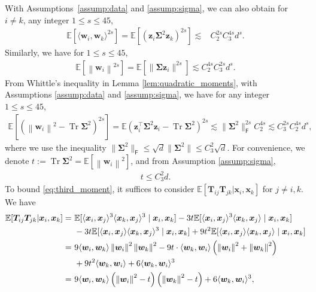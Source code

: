 \documentclass[twoside,11pt]{article}
\newcommand{\norm}[1]{\left\|#1\right\|}
\newcommand{\bw}{\boldsymbol{w}}
\newcommand{\E}{\mathbb{E}}
\def\bw{{\boldsymbol w}}
\def\bx{{\boldsymbol x}}
\def\bz{{\boldsymbol z}}
\def\bSigma{{\boldsymbol \Sigma}}
\def\T{{\mathbb T}}
\def\T{{\mathbb T}}
\renewcommand{\T}{\boldsymbol{T}}
\newcommand{\Tr}{\operatorname{Tr}}
\newcommand{\1}{\mathbf{1}}
\def\msf{\mathsf}
\begin{document}
\begin{enumerate}[label=\textbf{Case (\roman*).},leftmargin=0ex, itemindent=12ex]
 
With Assumptions~\ref{assump:data} and \ref{assump:sigma},  we can also obtain for $i\not=k$, any integer $1\leq s\leq 45$, 
\begin{align}
    \E\left[\langle \bw_i,\bw_k\rangle^{2s}\right]=\E[(\bz_i\bSigma^2 \bz_k)^{2s}] \lesssim &  C_2^{2s}C_3^{4s}d^s. \label{eq:wiwk}
\end{align}
Similarly, we have for $1\leq s\leq 45$,
\begin{align}\label{eq:wi}
  \E\left[\norm{\bw_i}^{2s}\right] =\E [\| \bSigma \bz_i\|^{2s}]\lesssim  C_2^{4s} C_3^{2s}d^{s}.
\end{align}
From Whittle's inequality \citep{whittle1960bounds} in  Lemma \ref{lem:quadratic_moments}, with Assumptions \ref{assump:data} and  \ref{assump:sigma}, we have for any integer $1\leq s\leq  45$,
\begin{align}
     \E\left[\left(\norm{\bw_i}^2-\Tr\bSigma^2\right)^{2s} \right]=\E (\bz_i^\top\bSigma^2 \bz_i-\Tr\bSigma^2)^{2s}\lesssim  \|\bSigma^2\|_{\msf F}^{2s} C_2^{4s}  \lesssim C_3^{2s} C_2^{4s}d^s,\label{eq:centered6}
\end{align}
where we use the inequality $\|\bSigma^2\|_{\msf F}\leq \sqrt{d} \|\bSigma^2\|\leq C_3^2 \sqrt{d}$. For convenience, we denote $t:=\Tr\bSigma^2=\E[\norm{\bw_i}^2]$, and from Assumption \ref{assump:sigma},
\begin{align}\label{eq:bound_t}
  t\leq C_3^2d.  
\end{align}
To bound \eqref{eq:third_moment}, it suffices to consider $\E [\T_{ij}\T_{jk}| \bx_i,\bx_k]$ for $j\not=i,k$. We have
\begin{align}
    \E [\T_{ij}\T_{jk}| \bx_i,\bx_k]=~& \E[\langle \bx_i,\bx_j\rangle ^3\langle \bx_k,\bx_j\rangle ^3 \mid \bx_i,\bx_k] -3t \E [\langle \bx_i,\bx_j\rangle ^3\langle \bx_k,\bx_j\rangle  \mid \bx_i,\bx_k] \notag \\
    &-3t \E [\langle \bx_i,\bx_j\rangle \langle \bx_k,\bx_j\rangle^3  \mid \bx_i,\bx_k]+9t^2  \E [\langle \bx_i,\bx_j\rangle \langle \bx_k,\bx_j\rangle  \mid \bx_i,\bx_k] \notag\\ 
    =~ &9\langle \bw_i,\bw_k\rangle \norm{\bw_i}^2\norm{\bw_k}^2-9t\cdot\langle \bw_k,\bw_i\rangle\left(\norm{\bw_i}^2+\norm{\bw_k}^2\right) \notag\\
    &+9t^2\langle \bw_k,\bw_i\rangle+6\langle \bw_k,\bw_i\rangle^3\nonumber\\
    =~& 9\langle \bw_i,\bw_k\rangle\left(\norm{\bw_i}^2-t\right)\left(\norm{\bw_k}^2-t\right)+6\langle \bw_k,\bw_i\rangle^3,\label{eq:FijFjk}
\end{align}

\end{enumerate}
\end{document}
